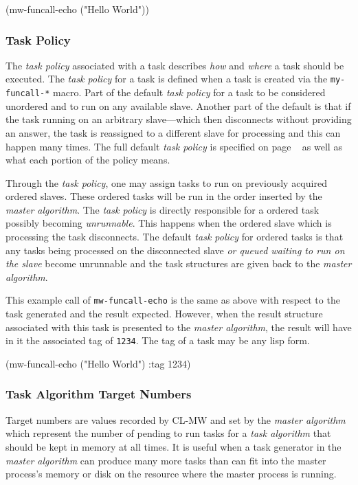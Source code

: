 \documentclass[titlepage,12pt]{book}
\newcommand{\xsmall}{\latexhtml{\small}{}}
\newcommand{\xnormalsize}{\latexhtml{\normalsize}{}}
\newcommand{\clmw}{\xsmall\textsc{CL-MW}\xnormalsize\xspace}
\newcommand{\ma}{\textit{master algorithm}\xspace}
\newcommand{\ta}{\textit{task algorithm}\xspace}
\newcommand{\tp}{\textit{task policy}\xspace}
\newcommand{\macro}[1]{\mbox{\texttt{#1}}\xspace}
\begin{document}
\begin{barelisp}
(mw-funcall-echo ("Hello World"))
\end{barelisp}

\subsubsection{Task Policy}

The \tp associated with a task describes \emph{how} and \emph{where}
a task should be executed.  The \tp for a task is defined when a
task is created via the \macro{my-funcall-*} macro. Part of the
default \tp for a task to be considered unordered and to run on
any available slave.  Another part of the default is that if the
task running on an arbitrary slave---which then disconnects without
providing an answer, the task is reassigned to a different slave for
processing and this can happen many times.  The full default \tp is
specified on page ~\pageref{task-policy} as well as what each portion
of the policy means.

Through the \tp, one may assign tasks to run on previously acquired
ordered slaves. These ordered tasks will be run in the
order inserted by the \ma.  The \tp is directly responsible for a
ordered task possibly becoming \emph{unrunnable}. This happens when
the ordered slave which is processing the task disconnects. The
default \tp for ordered tasks is that any tasks being processed on
the disconnected slave \textit{or queued waiting to run on the slave}
become unrunnable and the task structures are given back to the \ma.

This example call of \macro{mw-funcall-echo} is the same as above with
respect to the task generated and the result expected. However, when
the result structure associated with this task is presented to the
\ma, the result will have in it the associated tag of \texttt{1234}.
The tag of a task may be any lisp form.

\begin{barelisp}
(mw-funcall-echo ("Hello World") :tag 1234)
\end{barelisp}

\subsubsection{Task Algorithm Target Numbers}

Target numbers are values recorded by \clmw and set by the \ma which
represent the number of pending to run tasks for a \ta that should be
kept in memory at all times.  It is useful when a task generator in the
\ma can produce many more tasks than can fit into the master process's
memory or disk on the resource where the master process is running.
\end{document}
